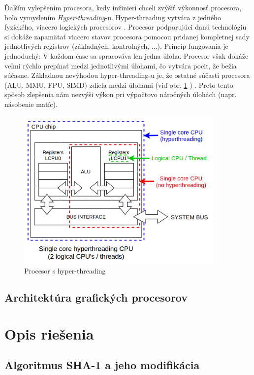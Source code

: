 \documentclass[conference]{IEEEtran}
\begin{document}
Ďalším vylepšením procesora, kedy inžinieri chceli zvýšiť výkonnosť procesora, bolo vymyslením \textit{Hyper-threading}-u. Hyper-threading vytvára z jedného fyzického, viacero logických procesorov \cite{hyperthreading}. Procesor podporujúci danú technológiu si dokáže zapamätať viacero stavov procesora pomocou pridanej kompletnej sady jednotlivých registrov (základných, kontrolných, ...).  
Princíp fungovania je jednoduchý: V každom čase sa spracováva len jedna úloha. Procesor však dokáže veľmi rýchlo prepínať medzi jednotlivými úlohami, čo vytvára pocit, že bežia súčasne. \newline
Základnou nevýhodou hyper-threading-u je, že ostatné súčasti procesora (ALU, MMU, FPU, SIMD) zdieľa medzi úlohami (viď obr. \ref{img} \cite{picture}) \cite{hyper2}. Preto tento spôsob zlepšenia nám nezvýši výkon pri výpočtovo náročných úlohách (napr. násobenie matíc).

\begin{figure}[!h]
\centering
\includegraphics[width=4in]{img/hyper}
\caption{Procesor s hyper-threading \label{img}}
\end{figure}


\subsection{Architektúra grafických procesorov}

\section{Opis riešenia}

\subsection{Algoritmus SHA-1 a jeho modifikácia}
\end{document}

